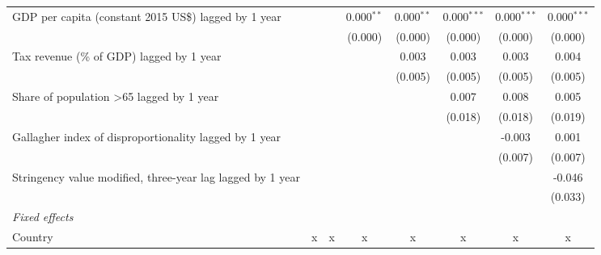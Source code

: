 \begin{tabular}{lccccccc}
   GDP per capita (constant 2015 US\$) lagged by 1 year                             &              &               & 0.000$^{**}$   & 0.000$^{**}$   & 0.000$^{***}$ & 0.000$^{***}$ & 0.000$^{***}$\\   
                                                                                    &              &               & (0.000)        & (0.000)        & (0.000)       & (0.000)       & (0.000)\\   
   Tax revenue (\% of GDP) lagged by 1 year                                         &              &               &                & 0.003          & 0.003         & 0.003         & 0.004\\   
                                                                                    &              &               &                & (0.005)        & (0.005)       & (0.005)       & (0.005)\\   
   Share of population >65 lagged by 1 year                                         &              &               &                &                & 0.007         & 0.008         & 0.005\\   
                                                                                    &              &               &                &                & (0.018)       & (0.018)       & (0.019)\\   
   Gallagher index of disproportionality lagged by 1 year                           &              &               &                &                &               & -0.003        & 0.001\\   
                                                                                    &              &               &                &                &               & (0.007)       & (0.007)\\   
   Stringency value modified, three-year lag lagged by 1 year                       &              &               &                &                &               &               & -0.046\\   
                                                                                    &              &               &                &                &               &               & (0.033)\\   
   \emph{Fixed effects}\\
   Country                                                                          & x            & x             & x              & x              & x             & x             & x\\  

\end{tabular}
